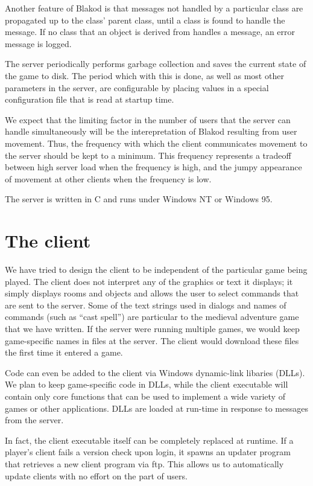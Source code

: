 \documentclass[12pt]{article}
\begin{document}
Another feature of Blakod is that messages not handled by a particular
class are propagated up to the class' parent class, until a class is
found to handle the message.  If no class that an object is derived
from handles a message, an error message is logged.

The server periodically performs garbage collection and saves the
current state of the game to disk.  The period which with this is
done, as well as most other parameters in the server, are configurable
by placing values in a special configuration file that is read at
startup time.

We expect that the limiting factor in the number of users that the
server can handle simultaneously will be the interepretation of Blakod
resulting from user movement.  Thus, the frequency with which the
client communicates movement to the server should be kept to a
minimum.  This frequency represents a tradeoff between high server
load when the frequency is high, and the jumpy appearance of movement
at other clients when the frequency is low.  

The server is written in C and runs under Windows NT or Windows 95.


\section{The client}

We have tried to design the client to be independent of the particular
game being played.  The client does not interpret any of the graphics
or text it displays; it simply displays rooms and objects and allows
the user to select commands that are sent to the server.  Some of the
text strings used in dialogs and names of commands (such as ``cast
spell'') are particular to the medieval adventure game that we have
written.  If the server were running multiple games, we would keep
game-specific names in files at the server.  The client would download
these files the first time it entered a game.

Code can even be added to the client via Windows dynamic-link libaries
(DLLs).  We plan to keep game-specific code in DLLs, while the client
executable will contain only core functions that can be used to
implement a wide variety of games or other applications.  DLLs are
loaded at run-time in response to messages from the server.

In fact, the client executable itself can be completely replaced at
runtime.  If a player's client fails a version check upon login, it
spawns an updater program that retrieves a new client program via ftp.
This allows us to automatically update clients with no effort on the
part of users.
\end{document}
